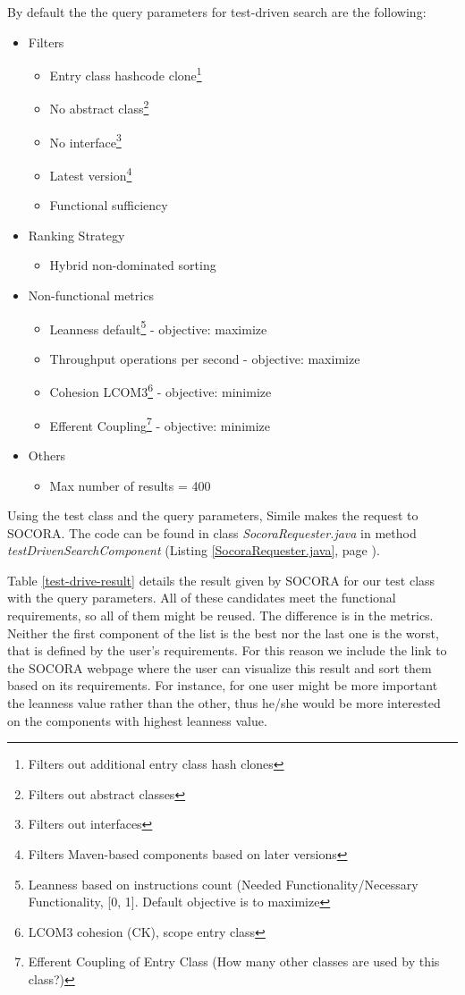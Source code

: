 By default the the query parameters for test-driven search are the following:

\begin{itemize}
\item Filters
	\begin{itemize}
	\item Entry class hashcode clone\footnote{Filters out additional entry class hash clones}
	\item No abstract class\footnote{Filters out abstract classes}
	\item No interface\footnote{Filters out interfaces}
	\item Latest version\footnote{Filters Maven-based components based on later versions}
	\item Functional sufficiency
	\end{itemize}
\item Ranking Strategy
	\begin{itemize}
	\item Hybrid non-dominated sorting
	\end{itemize}
\item Non-functional metrics
	\begin{itemize}
	\item Leanness default\footnote{Leanness based on instructions count (Needed Functionality/Necessary Functionality, [0, 1]. Default objective is to maximize} - objective: maximize
	\item Throughput operations per second - objective: maximize
	\item Cohesion LCOM3\footnote{LCOM3 cohesion (CK), scope entry class} - objective: minimize
	\item Efferent Coupling\footnote{Efferent Coupling of Entry Class (How many other classes are used by this class?)} - objective: minimize
	\end{itemize}
\item Others
	\begin{itemize}
	\item Max number of results = 400
	\end{itemize}
\end{itemize}

Using the test class and the query parameters, Simile makes the request to SOCORA. The code can be found in class \emph{SocoraRequester.java} in method \emph{testDrivenSearchComponent} (Listing \ref{SocoraRequester.java}, page \pageref{SocoraRequester.java}).

Table \ref{test-drive-result} details the result given by SOCORA for our test class with the query parameters. All of these candidates meet the functional requirements, so all of them might be reused. The difference is in the metrics. Neither the first component of the list is the best nor the last one is the worst, that is defined by the user's requirements. For this reason we include the link to the SOCORA webpage where the user can visualize this result and sort them based on its requirements. For instance, for one user might be more important the leanness value rather than the other, thus he/she would be more interested on the components with highest leanness value.

